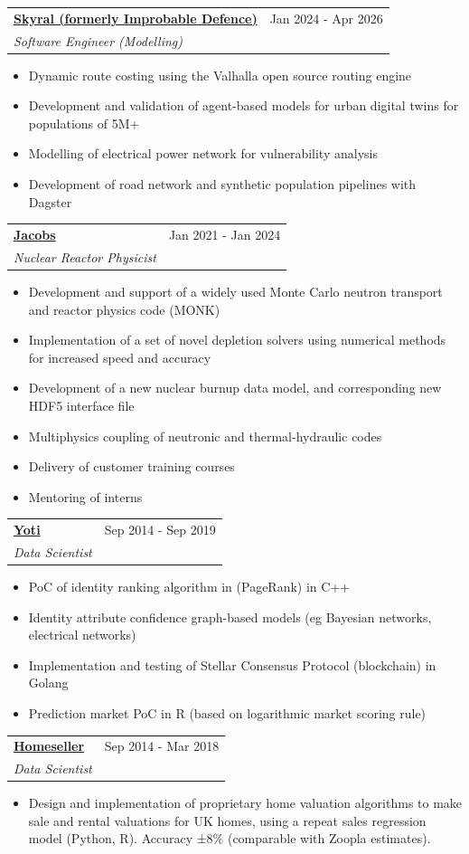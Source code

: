 \documentclass[a4paper, 11pt]{article}
\makeatletter
\newcommand{\resumeSubheading}[4]{
  \vspace{-1pt}\item
    \begin{tabular*}{0.97\textwidth}[t]{l@{\extracolsep{\fill}}r}
      \textbf{\href{#2}{#1}} & #3 \\
      \textit{\small#4}  \\
    \end{tabular*}\vspace{-5pt}
}
\newcommand{\resumeItemListStart}{\begin{itemize}}
\newcommand{\resumeItemListEnd}{\end{itemize}\vspace{-5pt}}
\makeatother
\begin{document}
    \resumeSubheading
      {Skyral (formerly Improbable Defence)}
      {https://skyral.com/}
      {Jan 2024 - Apr 2026}
      {Software Engineer (Modelling)}
      \resumeItemListStart
        \item\small Dynamic route costing using the Valhalla open source routing engine
        \item\small Development and validation of agent-based models for urban digital twins for populations of 5M+
        \item\small Modelling of electrical power network for vulnerability analysis
        \item\small Development of road network and synthetic population pipelines with Dagster
    \resumeItemListEnd            

    \resumeSubheading
      {Jacobs}
      {https://www.jacobs.com/}
      {Jan 2021 - Jan 2024}
      {Nuclear Reactor Physicist}
      \resumeItemListStart
        \item\small Development and support of a widely used Monte Carlo neutron transport and reactor physics code (MONK)
        \item\small Implementation of a set of novel depletion solvers using numerical methods for increased speed and accuracy
        \item\small Development of a new nuclear burnup data model, and corresponding new HDF5 interface file
        \item\small Multiphysics coupling of neutronic and thermal-hydraulic codes
        \item\small Delivery of customer training courses
        \item\small Mentoring of interns
    \resumeItemListEnd            

    \resumeSubheading
      {Yoti}
      {https://www.yoti.com/}
      {Sep 2014 - Sep 2019}
      {Data Scientist}
      \resumeItemListStart
        \item\small PoC of identity ranking algorithm in (PageRank) in C++
        \item\small Identity attribute confidence graph-based models (eg Bayesian networks, electrical networks)
        \item\small Implementation and testing of Stellar Consensus Protocol (blockchain) in Golang 
        \item\small Prediction market PoC in R (based on logarithmic market scoring rule)
    \resumeItemListEnd            
    
    \resumeSubheading
      {Homeseller}
      {}
      {Sep 2014 - Mar 2018}
      {Data Scientist}
      \resumeItemListStart
        \item\small Design and implementation of proprietary home valuation algorithms to make sale and rental valuations for UK homes, using a repeat sales regression model (Python, R). Accuracy ±8\% (comparable with Zoopla estimates).
    \resumeItemListEnd            
\end{document}
